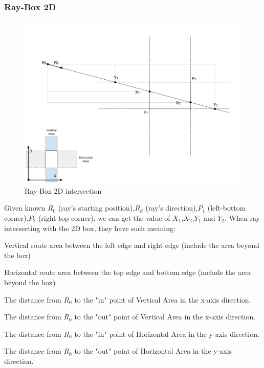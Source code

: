 \subsubsection{Ray-Box 2D}

\begin{figure}[H]
\caption{Ray-Box 2D intersection}
\label{fig:ray-box-2d}
\centering
\includegraphics[width=\textwidth, keepaspectratio]{Figures/ray-box-2d-intersection.png}
\decoRule
\end{figure}

Given known $R_0$ (ray's starting position),\enspace$R_d$ (ray's direction),\enspace$P_1$ (left-bottom corner),\enspace$P_2$ (right-top corner), we can get the value of $X_1$,\enspace$X_2$,\enspace$Y_1$ and $Y_2$. When ray intersecting with the 2D box, they have such meaning:

\begin{description}
	\setlength{\parskip}{0pt}
	\item[$\bullet$ Vertical Area] Vertical route area between the left edge and right edge (include the area beyond the box)
	\item[$\bullet$ Horizontal Area] Horizontal route area between the top edge and bottom edge (include the area beyond the box)
	\item[$\bullet$ $\mathbf{X}_1$] The distance from $R_0$ to the "in" point of Vertical Area in the x-axis direction. 
	\item[$\bullet$ $\mathbf{X}_2$] The distance from $R_0$ to the "out" point of Vertical Area in the x-axis direction. 
	\item[$\bullet$ $\mathbf{Y}_1$] The distance from $R_0$ to the "in" point of Horizontal Area in the y-axis direction.
	\item[$\bullet$ $\mathbf{Y}_2$] The distance from $R_0$ to the "out" point of Horizontal Area in the y-axis direction. 
\end{description}

